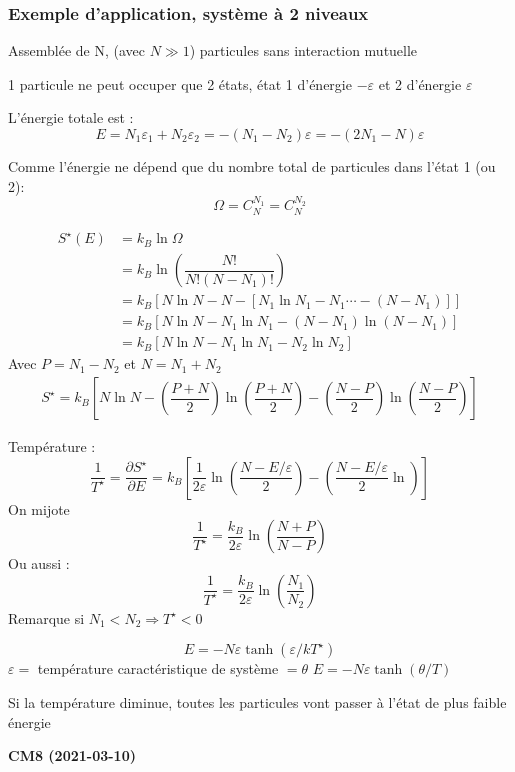 \documentclass[12pt,a4paper]{report}
\begin{document}
\subsubsection{Exemple d'application, système à 2 niveaux}

Assemblée de N, (avec $N \gg 1$) particules sans interaction mutuelle

1 particule ne peut occuper que 2 états, état 1 d'énergie $-\varepsilon$ et 2 d'énergie $\varepsilon$

L'énergie totale est :
\[
	E = N_1 \varepsilon_1 + N_2 \varepsilon_2 = -(N_1 - N_2)\varepsilon =-(2N_1 - N) \varepsilon
\]

Comme l'énergie ne dépend que du nombre total de particules dans l'état 1 (ou 2):
\[
	\Omega = C_N^{N_1} = C_N^{N_2}
\]

\begin{align*}
	S^\star(E) &= k_B \ln \Omega\\
	&= k_B \ln \left( \dfrac{N!}{N!(N-N_1)!} \right)\\
	&= k_B [ N \ln N - N - [ N_1 \ln N_1 - N_1 \cdots - (N - N_1)]]\\
	&= k_B [ N \ln N - N_1 \ln N_1 - (N -N_1) \ln (N-N_1)]\\
	&= k_B [N \ln N - N_1 \ln N_1 - N_2 \ln N_2]
\end{align*}
Avec $P = N_1 -N_2$ et $N = N_1 + N_2$
\begin{align*}
	S^\star = k_B [N  \ln N - \left( \dfrac{P + N}{2} \right)\ln\left( \dfrac{P + N}{2} \right) - \left( \dfrac{N - P}{2} \right) \ln \left( \dfrac{N - P}{2} \right)]
\end{align*}

Température :
\[
	\dfrac{1}{T^\star} = \dfrac{\partial S^\star}{\partial E} = k_B \left[ \dfrac{1}{2 \varepsilon} \ln \left( \dfrac{N -E/\varepsilon}{2} \right) - \left( \dfrac{N - E/\varepsilon}{2} \ln \right) \right]
\]
On mijote
\[
	\dfrac{1}{T^\star} = \dfrac{k_B}{2 \varepsilon} \ln \left( \dfrac{N + P}{N-P} \right)
\]
Ou aussi :
\[
	\dfrac{1}{T^\star} = \dfrac{k_B}{2 \varepsilon} \ln \left( \dfrac{N_1}{N_2} \right)
\]
Remarque si $N_1 < N_2 \Rightarrow T^\star < 0$

\[
	E = -N\varepsilon \tanh (\varepsilon/kT^\star)
\]
$\varepsilon = $ température caractéristique de système $= \theta$
$E = -N \varepsilon \tanh(\theta/T)$

Si la température diminue, toutes les particules vont passer à l'état de plus faible énergie

\begin{center}
\textbf{CM8 (2021-03-10)}
\end{center}
\end{document}
